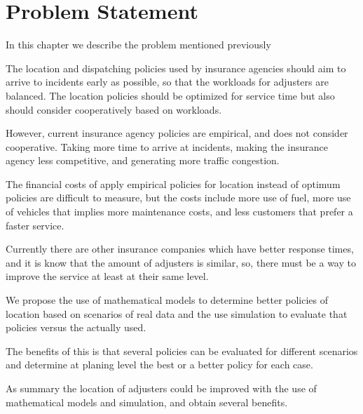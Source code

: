 \chapter{Problem Statement}
In this chapter we describe the problem
mentioned previously

The location and dispatching policies
used by insurance agencies
should aim
to arrive to incidents
early as possible,
so that
the workloads for adjusters are balanced.
The location policies
should be optimized for service time
but also should consider
cooperatively
based on workloads.

However,
current insurance agency policies
are empirical,
and does not consider cooperative.
Taking more time to arrive at incidents,
making the insurance agency
less competitive,
and generating more traffic congestion.

The financial costs
of apply
empirical policies for location
instead of optimum policies
are difficult to measure,
but the costs include
more use of fuel,
more use of vehicles
that implies
more maintenance costs,
and less customers
that prefer a faster service.

Currently
there are other
insurance companies
which have
better response times,
and
it is know
that the amount of adjusters
is similar,
so,
there must be
a way to improve the service
at least at their same level.

We propose
the use of mathematical models
to determine better policies of location
based on scenarios
of real data
and the use simulation
to evaluate that policies
versus the actually used.

The benefits of this
is that several policies
can be evaluated
for different scenarios
and determine
at planing level
the best or a better policy
for each case.

As summary
the location of adjusters
could be improved
with the use of
mathematical models and simulation,
and obtain several benefits.



